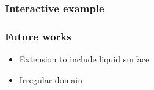 \documentclass[serif,mathserif, 12pt]{beamer}
\begin{document}
\begin{frame}
  \frametitle{Interactive example}
\end{frame}

\begin{frame}
  \frametitle{Future works}
  \begin{itemize}
  \item Extension to include liquid surface
  \item Irregular domain
  \end{itemize}
\end{frame}

\begin{frame} 
\end{frame}
\end{document}
